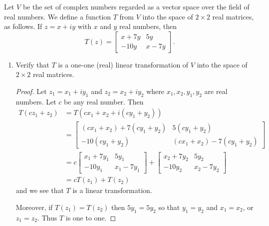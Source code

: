  Let $V$ be the set of complex numbers regarded as a vector
space over the field of real numbers. We define a function $T$ from
$V$ into the space of $2\times2$ real matrices, as follows. If
$z = x + iy$ with $x$ and $y$ real numbers, then
\begin{equation*}
  T(z) =
  \begin{bmatrix}
    x + 7y & 5y \\
    -10y & x - 7y
  \end{bmatrix}.
\end{equation*}
\begin{enumerate}
\item Verify that $T$ is a one-one (real) linear transformation of $V$
  into the space of $2\times2$ real matrices.
  \begin{proof}
    Let $z_1 = x_1 + iy_1$ and $z_2 = x_2 + iy_2$ where
    $x_1,x_2,y_1,y_2$ are real numbers. Let $c$ be any real
    number. Then
    \begin{align*}
      T(cz_1 + z_2)
      &= T(cx_1 + x_2 + i(cy_1 + y_2)) \\
      &=
      \begin{bmatrix}
        (cx_1 + x_2) + 7(cy_1 + y_2) & 5(cy_1 + y_2) \\
        -10(cy_1 + y_2) & (cx_1 + x_2) - 7(cy_1 + y_2)
      \end{bmatrix} \\
      &= c
      \begin{bmatrix}
        x_1 + 7y_1 & 5y_1 \\
        -10y_1 & x_1 - 7y_1
      \end{bmatrix}
      +
      \begin{bmatrix}
        x_2 + 7y_2 & 5y_2 \\
        -10y_2 & x_2 - 7y_2
      \end{bmatrix} \\
      &= cT(z_1) + T(z_2)
    \end{align*}
    and we see that $T$ is a linear transformation.

    Moreover, if $T(z_1) = T(z_2)$ then $5y_1 = 5y_2$ so that
    $y_1 = y_2$ and $x_1 = x_2$, or $z_1 = z_2$. Thus $T$ is one to
    one.
  \end{proof}


\end{enumerate}
